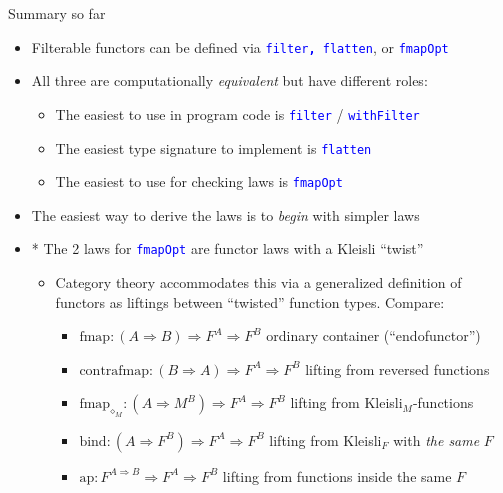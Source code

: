 \documentclass[english]{beamer}
\begin{document}
\begin{frame}{Summary so far}

\begin{itemize}
\item Filterable functors can be defined via \texttt{\textcolor{blue}{\footnotesize{}filter}}\texttt{\textbf{\textcolor{blue}{\footnotesize{},
}}}\texttt{\textcolor{blue}{\footnotesize{}flatten}}, or \texttt{\textcolor{blue}{\footnotesize{}fmapOpt}} 
\item All three are computationally \emph{equivalent} but have different
roles:
\begin{itemize}
\item The easiest to use in program code is \texttt{\textcolor{blue}{\footnotesize{}filter}}
/ \texttt{\textcolor{blue}{\footnotesize{}withFilter}} 
\item The easiest type signature to implement is \texttt{\textcolor{blue}{\footnotesize{}flatten}} 
\item The easiest to use for checking laws is \texttt{\textcolor{blue}{\footnotesize{}fmapOpt}} 
\end{itemize}
\item The easiest way to derive the laws is to \emph{begin} with simpler
laws
\item {*} The 2 laws for \texttt{\textcolor{blue}{\footnotesize{}fmapOpt}}
are functor laws with a Kleisli ``twist''
\begin{itemize}
\item Category theory accommodates this via a generalized definition of
functors as liftings between ``twisted'' function types. Compare:
\begin{itemize}
\item $\text{fmap}:\left(A\Rightarrow B\right)\Rightarrow F^{A}\Rightarrow F^{B}$
\textendash{} ordinary container (``endofunctor'')
\item $\text{contrafmap}:\left(B\Rightarrow A\right)\Rightarrow F^{A}\Rightarrow F^{B}$
\textendash{} lifting from reversed functions
\item $\text{fmap}_{\diamond_{M}}:\left(A\Rightarrow M^{B}\right)\Rightarrow F^{A}\Rightarrow F^{B}$
\textendash{} lifting from Kleisli$_{M}$-functions
\item $\text{bind}:\left(A\Rightarrow F^{B}\right)\Rightarrow F^{A}\Rightarrow F^{B}$
\textendash{} lifting from Kleisli$_{F}$ with \emph{the same} $F$
\item $\text{ap}:F^{A\Rightarrow B}\Rightarrow F^{A}\Rightarrow F^{B}$
\textendash{} lifting from functions inside the same $F$ 

\end{itemize}
\end{itemize}
\end{itemize}
\end{frame}
\end{document}
